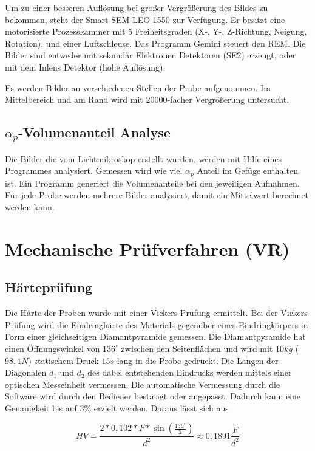 Um zu einer besseren Auflösung bei großer Vergrößerung des Bildes zu bekommen, steht der Smart SEM LEO 1550 zur Verfügung. Er besitzt eine motorisierte Prozesskammer mit 5 Freiheitsgraden (X-, Y-, Z-Richtung, Neigung, Rotation), und einer Luftschleuse. Das Programm Gemini steuert den REM. Die Bilder sind entweder mit sekundär Elektronen Detektoren (SE2) erzeugt, oder mit dem Inlens Detektor (hohe Auflösung). 

Es werden Bilder an verschiedenen Stellen der Probe aufgenommen. Im Mittelbereich und am Rand wird mit 20000-facher Vergrößerung untersucht. 


\subsection{$\alpha_{p}$-Volumenanteil Analyse}

Die Bilder die vom Lichtmikroskop erstellt wurden, werden mit Hilfe eines Programmes analysiert. Gemessen wird wie viel $\alpha_{p}$ Anteil im Gefüge enthalten ist. Ein Programm generiert die Volumenanteile bei den jeweiligen Aufnahmen. Für jede Probe werden mehrere Bilder analysiert, damit ein Mittelwert berechnet werden kann. 



\section{Mechanische Prüfverfahren (VR)}

\subsection{Härteprüfung}

Die Härte der Proben wurde mit einer Vickers-Prüfung ermittelt. Bei der Vickers-Prüfung wird die Eindringhärte des Materials gegenüber eines Eindringkörpers in Form einer gleichseitigen Diamantpyramide gemessen. Die Diamantpyramide hat einen Öffnungswinkel von $136^\circ$ zwischen den Seitenflächen und wird mit $10 kg$ ($98,1 N$) statischem Druck $15 s$ lang in die Probe gedrückt. Die Längen der Diagonalen $d_1$ und $d_2$ des dabei entstehenden Eindrucks werden mittels einer optischen Messeinheit vermessen. Die automatische Vermessung durch die Software wird durch den Bediener bestätigt oder angepasst. Dadurch kann eine Genauigkeit bis auf 3\% erzielt werden. Daraus lässt sich aus

$$HV=\frac {2*0,102*F*\sin \left( \frac{136^\circ}{2}\right) } {d^2} \approx 0,1891 \frac{F}{d^2}$$

